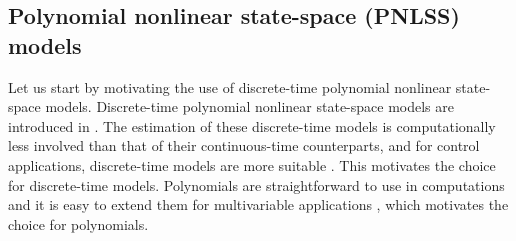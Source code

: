 \documentclass[review]{elsarticle}
\begin{document}
\subsection{Polynomial nonlinear state-space (PNLSS) models\label{PNLSS}}
Let us start by motivating the use of discrete-time polynomial nonlinear state-space models. 
Discrete-time polynomial nonlinear state-space models are introduced in \citep{Paduart1,Paduart3,Paduart4}.
The estimation of these discrete-time models is computationally less involved than that of their continuous-time counterparts, and for control applications, discrete-time models are more suitable \citep{Paduart4}. This motivates the choice for discrete-time models.
Polynomials are straightforward to use in computations and it is easy to extend them for multivariable applications \citep{Paduart1}, which motivates the choice for polynomials.
\end{document}
